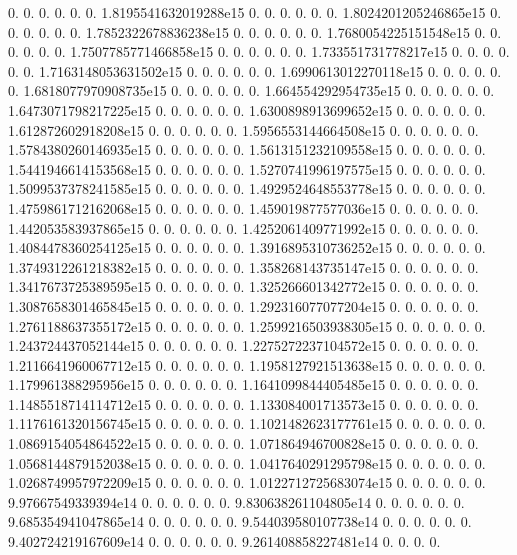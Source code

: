 0. 0. 0. 0. 0. 0. 1.\+8195541632019288e15 0. 0. 0. 0. 0. 0. 1.\+8024201205246865e15 0. 0. 0. 0. 0. 0. 1.\+7852322678836238e15 0. 0. 0. 0. 0. 0. 1.\+7680054225151548e15 0. 0. 0. 0. 0. 0. 1.\+7507785771466858e15 0. 0. 0. 0. 0. 0. 1.\+733551731778217e15 0. 0. 0. 0. 0. 0. 1.\+7163148053631502e15 0. 0. 0. 0. 0. 0. 1.\+6990613012270118e15 0. 0. 0. 0. 0. 0. 1.\+6818077970908735e15 0. 0. 0. 0. 0. 0. 1.\+664554292954735e15 0. 0. 0. 0. 0. 0. 1.\+6473071798217225e15 0. 0. 0. 0. 0. 0. 1.\+6300898913699652e15 0. 0. 0. 0. 0. 0. 1.\+612872602918208e15 0. 0. 0. 0. 0. 0. 1.\+5956553144664508e15 0. 0. 0. 0. 0. 0. 1.\+5784380260146935e15 0. 0. 0. 0. 0. 0. 1.\+5613151232109558e15 0. 0. 0. 0. 0. 0. 1.\+5441946614153568e15 0. 0. 0. 0. 0. 0. 1.\+5270741996197575e15 0. 0. 0. 0. 0. 0. 1.\+5099537378241585e15 0. 0. 0. 0. 0. 0. 1.\+4929524648553778e15 0. 0. 0. 0. 0. 0. 1.\+4759861712162068e15 0. 0. 0. 0. 0. 0. 1.\+459019877577036e15 0. 0. 0. 0. 0. 0. 1.\+442053583937865e15 0. 0. 0. 0. 0. 0. 1.\+4252061409771992e15 0. 0. 0. 0. 0. 0. 1.\+4084478360254125e15 0. 0. 0. 0. 0. 0. 1.\+3916895310736252e15 0. 0. 0. 0. 0. 0. 1.\+3749312261218382e15 0. 0. 0. 0. 0. 0. 1.\+358268143735147e15 0. 0. 0. 0. 0. 0. 1.\+3417673725389595e15 0. 0. 0. 0. 0. 0. 1.\+325266601342772e15 0. 0. 0. 0. 0. 0. 1.\+3087658301465845e15 0. 0. 0. 0. 0. 0. 1.\+292316077077204e15 0. 0. 0. 0. 0. 0. 1.\+2761188637355172e15 0. 0. 0. 0. 0. 0. 1.\+2599216503938305e15 0. 0. 0. 0. 0. 0. 1.\+243724437052144e15 0. 0. 0. 0. 0. 0. 1.\+2275272237104572e15 0. 0. 0. 0. 0. 0. 1.\+2116641960067712e15 0. 0. 0. 0. 0. 0. 1.\+1958127921513638e15 0. 0. 0. 0. 0. 0. 1.\+179961388295956e15 0. 0. 0. 0. 0. 0. 1.\+1641099844405485e15 0. 0. 0. 0. 0. 0. 1.\+1485518714114712e15 0. 0. 0. 0. 0. 0. 1.\+133084001713573e15 0. 0. 0. 0. 0. 0. 1.\+1176161320156745e15 0. 0. 0. 0. 0. 0. 1.\+1021482623177761e15 0. 0. 0. 0. 0. 0. 1.\+0869154054864522e15 0. 0. 0. 0. 0. 0. 1.\+071864946700828e15 0. 0. 0. 0. 0. 0. 1.\+0568144879152038e15 0. 0. 0. 0. 0. 0. 1.\+0417640291295798e15 0. 0. 0. 0. 0. 0. 1.\+0268749957972209e15 0. 0. 0. 0. 0. 0. 1.\+0122712725683074e15 0. 0. 0. 0. 0. 0. 9.\+97667549339394e14 0. 0. 0. 0. 0. 0. 9.\+830638261104805e14 0. 0. 0. 0. 0. 0. 9.\+685354941047865e14 0. 0. 0. 0. 0. 0. 9.\+544039580107738e14 0. 0. 0. 0. 0. 0. 9.\+402724219167609e14 0. 0. 0. 0. 0. 0. 9.\+261408858227481e14 0. 0. 0. 0. 